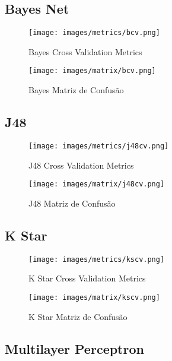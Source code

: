 \subsection{Bayes Net}

\begin{figure}[H]
  \centering
  \texttt{[image: images/metrics/bcv.png]}
  \caption{Bayes Cross Validation Metrics}
  \label{fig:b_cv_metrics}
\end{figure}

\begin{figure}[H]
  \centering
  \texttt{[image: images/matrix/bcv.png]}
  \caption{Bayes Matriz de Confusão}
  \label{fig:b_cv_matrix}
\end{figure}

\subsection{J48}

\begin{figure}[H]
  \centering
  \texttt{[image: images/metrics/j48cv.png]}
  \caption{J48 Cross Validation Metrics}
  \label{fig:j48_cv_metrics}
\end{figure}

\begin{figure}[H]
  \centering
  \texttt{[image: images/matrix/j48cv.png]}
  \caption{J48 Matriz de Confusão}
  \label{fig:j48_cv_matrix}
\end{figure}

\subsection{K Star}

\begin{figure}[H]
  \centering
  \texttt{[image: images/metrics/kscv.png]}
  \caption{K Star Cross Validation Metrics}
  \label{fig:ks_cv_metrics}
\end{figure}

\begin{figure}[H]
  \centering
  \texttt{[image: images/matrix/kscv.png]}
  \caption{K Star Matriz de Confusão}
  \label{fig:ks_cv_matrix}
\end{figure}


\subsection{Multilayer Perceptron}

